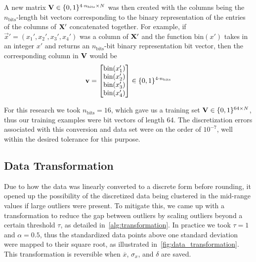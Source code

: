 A new matrix \( \mathbf{V} \in \{0,1\}^{4\cdot n_\text{bits} \times N} \) was then created with the columns being the \( n_\text{bits} \)-length bit vectors corresponding to the binary representation of the entries of the columns of \( \mathbf{X}' \) concatenated together.
For example, if \( \vec{x}' = (x_1',x_2',x_3',x_4') \) was a column of \( \mathbf{X}' \) and the function \( \text{bin}(x') \) takes in an integer \( x' \) and returns an \( n_\text{bits} \)-bit binary representation bit vector, then the corresponding column in \( \mathbf{V} \) would be
\begin{align}
    \mathbf{v} = \begin{bmatrix}
        \text{bin}(x_1') \\
        \text{bin}(x_2') \\
        \text{bin}(x_3') \\
        \text{bin}(x_4') \\
    \end{bmatrix}
    \in \{0,1\}^{4\cdot n_\text{bits}}
\end{align}

For this research we took \( n_\text{bits} = 16 \), which gave us a training set \( \mathbf{V} \in \{0,1\}^{64 \times N} \), thus our training examples were bit vectors of length 64.
The discretization errors associated with this conversion and data set were on the order of \( 10^{-7} \), well within the desired tolerance for this purpose.

\subsection{Data Transformation}
Due to how the data was linearly converted to a discrete form before rounding, it opened up the possibility of the discretized data being clustered in the mid-range values if large outliers were present.
To mitigate this, we came up with a transformation to reduce the gap between outliers by scaling outliers beyond a certain threshold \( \tau \), as detailed in~\cref{alg:transformation}.
In practice we took \( \tau = 1 \) and \( \alpha = 0.5 \), thus the standardized data points above one standard deviation were mapped to their square root, as illustrated in~\cref{fig:data_transformation}.
This transformation is reversible when \( \overline{x} \), \( \sigma_x \), and \( \delta \) are saved.

